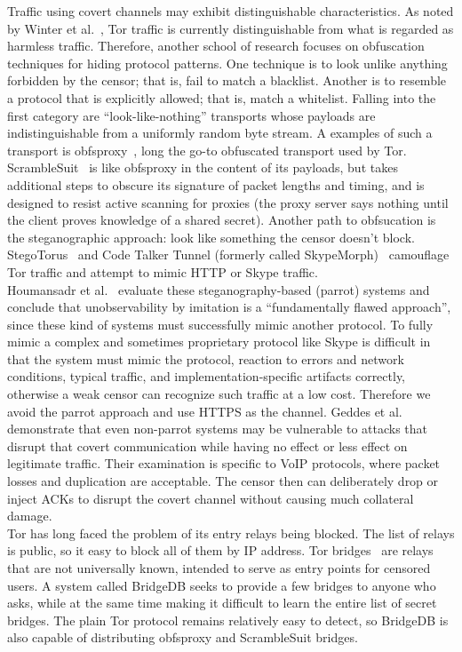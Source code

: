 \documentclass{article}
\begin{document}
Traffic using covert channels may exhibit distinguishable characteristics. As
noted by Winter et al.~\cite{foci12-winter}, Tor traffic is currently
distinguishable from what is regarded as harmless traffic. Therefore, another
school of research focuses on obfuscation techniques for hiding protocol
patterns. One technique is to look unlike anything forbidden by the censor; that
is, fail to match a blacklist. Another is to resemble a protocol that is
explicitly allowed; that is, match a whitelist. Falling into the first category
are ``look-like-nothing'' transports whose payloads are indistinguishable from a
uniformly random byte stream. A examples of such a transport is
obfsproxy~\cite{obfsproxy}, long the go-to obfuscated transport used by Tor.
ScrambleSuit~\cite{scramblesuit} is like obfsproxy in the content of its
payloads, but takes additional steps to obscure its signature of packet lengths
and timing, and is designed to resist active scanning for proxies (the proxy
server says nothing until the client proves knowledge of a shared secret).
Another path to obfsucation is the steganographic approach: look like something
the censor doesn't block. StegoTorus~\cite{stegotorus} and Code Talker Tunnel (formerly called SkypeMorph)~\cite{skypemorph} camouflage Tor
traffic and attempt to mimic HTTP or Skype traffic.\\

Houmansadr et al.~\cite{parrot} evaluate these steganography-based (parrot)
systems and conclude that unobservability by imitation is a ``fundamentally
flawed approach'', since these kind of systems must successfully mimic another
protocol. To fully mimic a complex and sometimes proprietary protocol like Skype
is difficult in that the system must mimic the protocol,  reaction to errors and
network conditions, typical traffic, and implementation-specific artifacts
correctly, otherwise a weak censor can recognize such traffic at a low cost.
Therefore we avoid the parrot approach and use HTTPS as the channel. Geddes  et
al.~\cite{acks} demonstrate that even non-parrot systems may be vulnerable to
attacks that disrupt that covert communication while having no effect or less
effect on legitimate traffic. Their examination is specific to VoIP protocols,
where packet losses and duplication are acceptable. The censor then can
deliberately drop or inject ACKs to disrupt the covert channel without causing
much collateral damage.\\

Tor has long faced the problem of its entry relays being blocked. The list of
relays is public, so it easy to block all of them by IP address. Tor
bridges~\cite{tor-blocking} are relays that are not universally known, intended
to serve as entry points for censored users. A system called BridgeDB seeks to
provide a few bridges to anyone who asks, while at the same time making it
difficult to learn the entire list of secret bridges. The plain Tor protocol
remains relatively easy to detect, so BridgeDB is also capable of distributing
obfsproxy and ScrambleSuit bridges.\\
\end{document}
